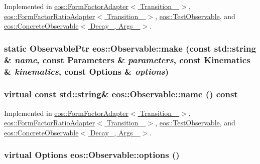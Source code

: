 Implemented in \hyperlink{classeos_1_1FormFactorAdapter_ae4fc137cd1c8b5703ffd6986e9ce739b}{eos::FormFactorAdapter$<$ Transition\_\- $>$}, \hyperlink{classeos_1_1FormFactorRatioAdapter_a821bf6d21630dd75c8a25cd18f1cdd59}{eos::FormFactorRatioAdapter$<$ Transition\_\- $>$}, \hyperlink{structeos_1_1TestObservable_a87b7da05ef887b71fee092252a70a685}{eos::TestObservable}, and \hyperlink{classeos_1_1ConcreteObservable_abffd48fad6c67448f99c2024a6c81ad7}{eos::ConcreteObservable$<$ Decay\_\-, Args\_\- $>$}.\hypertarget{classeos_1_1Observable_a949bf84938bcc9ab75075801c636763c}{
\subsubsection[{make}]{\setlength{\rightskip}{0pt plus 5cm}static {\bf ObservablePtr} eos::Observable::make (const std::string \& {\em name}, \/  const {\bf Parameters} \& {\em parameters}, \/  const {\bf Kinematics} \& {\em kinematics}, \/  const {\bf Options} \& {\em options})}}
\label{classeos_1_1Observable_a949bf84938bcc9ab75075801c636763c}
\hypertarget{classeos_1_1Observable_adfdc8fe469e00adeb464d3b3e4e14236}{
\subsubsection[{name}]{\setlength{\rightskip}{0pt plus 5cm}virtual const std::string\& eos::Observable::name () const}}
\label{classeos_1_1Observable_adfdc8fe469e00adeb464d3b3e4e14236}


Implemented in \hyperlink{classeos_1_1FormFactorAdapter_ad4b0b6158fcbbdafeae6d62a2326ac92}{eos::FormFactorAdapter$<$ Transition\_\- $>$}, \hyperlink{classeos_1_1FormFactorRatioAdapter_a4794ed40d561e939e566f328d16652fe}{eos::FormFactorRatioAdapter$<$ Transition\_\- $>$}, \hyperlink{structeos_1_1TestObservable_a1cc59da836d9dab76351b7afcbdb73f1}{eos::TestObservable}, and \hyperlink{classeos_1_1ConcreteObservable_a777d479052396c8dc1b73f752fdb3539}{eos::ConcreteObservable$<$ Decay\_\-, Args\_\- $>$}.\hypertarget{classeos_1_1Observable_a237cf968a4f46a93e0cc8ba0fdbaceee}{
\subsubsection[{options}]{\setlength{\rightskip}{0pt plus 5cm}virtual {\bf Options} eos::Observable::options ()}}
\label{classeos_1_1Observable_a237cf968a4f46a93e0cc8ba0fdbaceee}


